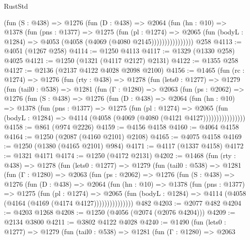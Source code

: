 \begin{lexlean}{RustStd}
\begin{coremodule}
                  (fun (S : @438) =>
                  @1276
                    (fun (D : @438) =>
                    @2064
                      (fun (hn : @10) =>
                      @1378
                        (fun (pns : @1377) =>
                        @1275
                          (fun (pl : @1274) =>
                          @2065
                            (fun (bodyL : @1284) => @4053 (@4058 (@4069 (@4080 @2145))))))))))))))))
    @258
@4113 := @4051 (@1267 @258)
@4114 := @1250 @4113
@4117 := @1329 (@1330 @258) @4025
@4121 := @1250 (@1321 (@4117 @2127) @2131)
@4122 := @1355 @258
@4127 := @2136 (@2137 @4122 @4028 @2098 @2100)
@4156 := @1465
    (fun (rc : @1274) =>
    @1276
      (fun (rty : @438) =>
      @1278
        (fun (lets0 : @1277) =>
        @1279
          (fun (tail0 : @538) =>
          @1281
            (fun (Γ : @1280) =>
            @2063
              (fun (ps : @2062) =>
              @1276
                (fun (S : @438) =>
                @1276
                  (fun (D : @438) =>
                  @2064
                    (fun (hn : @10) =>
                    @1378
                      (fun (pns : @1377) =>
                      @1275
                        (fun (pl : @1274) =>
                        @2065
                          (fun (bodyL : @1284) =>
                          @4114 (@4058 (@4069 (@4080 (@4121 @4127))))))))))))))))
@4158 := @861 (@974 @2226)
@4159 := @4156 @4158
@4160 := @4064 @4158
@4164 := @1250 (@2087 (@4160 @2101) @2108)
@4165 := @4075 @4158
@4169 := @1250 (@1380 (@4165 @2101) @984)
@4171 := @4117 (@1337 @4158)
@4172 := @1321 @4171
@4174 := @1250 (@4172 @2131)
@4202 := @1468
    (fun (rty : @438) =>
    @1278
      (fun (lets0 : @1277) =>
      @1279
        (fun (tail0 : @538) =>
        @1281
          (fun (Γ : @1280) =>
          @2063
            (fun (ps : @2062) =>
            @1276
              (fun (S : @438) =>
              @1276
                (fun (D : @438) =>
                @2064
                  (fun (hn : @10) =>
                  @1378
                    (fun (pns : @1377) =>
                    @1275
                      (fun (pl : @1274) =>
                      @2065
                        (fun (bodyL : @1284) =>
                        @4114 (@4058 (@4164 (@4169 (@4174 @4127)))))))))))))))
    @482
@4203 := @2077 @482
@4204 := @4203 @1268
@4208 := @1250 (@4056 (@2074 (@2076 @4204)))
@4209 := @2134 @3800
@4211 := @3802 @4122 @4028
@4240 := @1490
    (fun (lets0 : @1277) =>
    @1279
      (fun (tail0 : @538) =>
      @1281
        (fun (Γ : @1280) =>
        @2063

\end{coremodule}
\end{lexlean}
